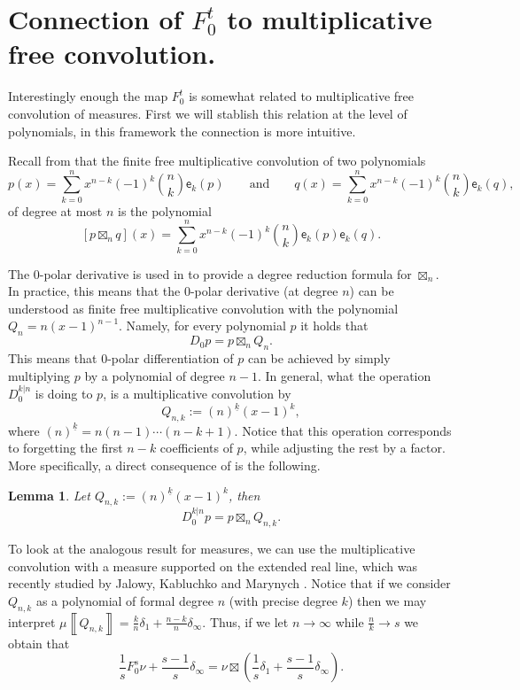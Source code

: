 \documentclass[reqno,11pt]{amsart}
\newtheorem{lemma}[theorem]{Lemma}
\theoremstyle{remark}
\newcommand{\falling}[2]{\left(#1\right)^{\underline{#2}}}
\newcommand{\polar}[1]{D_{#1}}
\newcommand{\polars}[3]{D_{#1}^{#2|#3}}
\newcommand{\pfreepower}[2]{F_{#1}^{#2}}
\newcommand{\meas}[1]{\mu \left\llbracket #1 \right\rrbracket}
\newcommand{\coef}[2]{\mathsf{e}_{#1}\left(#2\right)}
\begin{document}
\section{Connection of \texorpdfstring{$\pfreepower{0}{t}$}{F0t} to multiplicative free convolution.}
\label{sec:connection.to.free.mult}

Interestingly enough the map $\pfreepower{0}{t}$ is somewhat related to multiplicative free convolution of measures. First we will stablish this relation at the level of polynomials, in this framework the connection is more intuitive.

Recall from \cite{marcus2016polynomial} that the finite free multiplicative convolution of two polynomials
$$ p(x)=\sum_{k=0}^n x^{n-k}(-1)^k \binom{n}{k} \coef{k}{p}\qquad \text{and} \qquad q(x)=\sum_{k=0}^n x^{n-k}(-1)^k \binom{n}{k} \coef{k}{q},$$
of degree at most $n$ is the polynomial
$$[p\boxtimes_n q](x)=\sum_{k=0}^n x^{n-k}(-1)^k \binom{n}{k} \coef{k}{p}\coef{k}{q}.$$

The 0-polar derivative is used in \cite[Lemma 4.9]{marcus2016polynomial} to provide a degree reduction formula for $\boxtimes_n$. In practice, this means that the 0-polar derivative (at degree $n$) can be understood as finite free multiplicative convolution with the polynomial $Q_n=n(x-1)^{n-1}$. Namely, for every polynomial $p$ it holds that
$$\polar{0}p=p\boxtimes_n Q_n.$$
This means that 0-polar differentiation of $p$ can be achieved by simply multiplying $p$ by a polynomial of degree $n-1$. In general, what the operation $\polars{0}{k}{n}$ is doing to $p$, is a multiplicative convolution by
$$Q_{n,k}:= \falling{n}{k} (x-1)^k,$$
where $\falling{n}{k}=n(n-1) \cdots(n-k+1)$. Notice that this operation corresponds to forgetting the first $n-k$ coefficients of $p$, while adjusting the rest by a factor. More specifically, a direct consequence of \cite[Lemma 4.9]{marcus2016polynomial} is the following.

\begin{lemma}
Let $Q_{n,k}:= \falling{n}{k} (x-1)^k$, then
$$\polars{0}{k}{n}p=p\boxtimes_n Q_{n,k}.$$    
\end{lemma}

To look at the analogous result for measures, we can use the multiplicative convolution with a measure supported on the extended real line, which was recently studied by Jalowy, Kabluchko and Marynych \cite[Proposition 6.6]{jalowy2025zeros}.
Notice that if we consider $Q_{n,k}$ as a polynomial of formal degree $n$ (with precise degree $k$) then we may interpret $\meas{Q_{n,k}}=\frac{k}{n}\delta_1+\frac{n-k}{n}\delta_\infty$. Thus, if we let $n\to\infty$ while $\frac{n}{k}\to s$ we obtain that
\begin{equation}
\label{eq:formula.pfreepower0}
\frac{1}{s}\pfreepower{0}{s} \nu + \frac{s-1}{s}\delta_{\infty}=  \nu \boxtimes \left(\frac{1}{s}\delta_1+\frac{s-1}{s}\delta_\infty\right).   
\end{equation}
\end{document}
